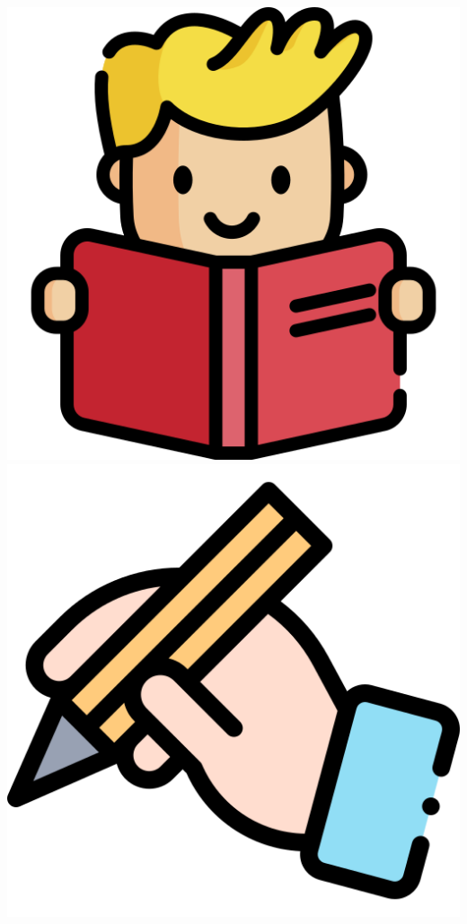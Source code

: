 \begin{tcolorbox}
\begin{spacing}{1.2}
\begin{multicols}{2}
            \vspace*{-3mm}
            \begin{center}
                \includegraphics[scale=0.055]{figs/read.png}
                \hfill
                \includegraphics[scale=0.055]{figs/writing.png}

\end{center}
\end{multicols}
\end{spacing}
\end{tcolorbox}
